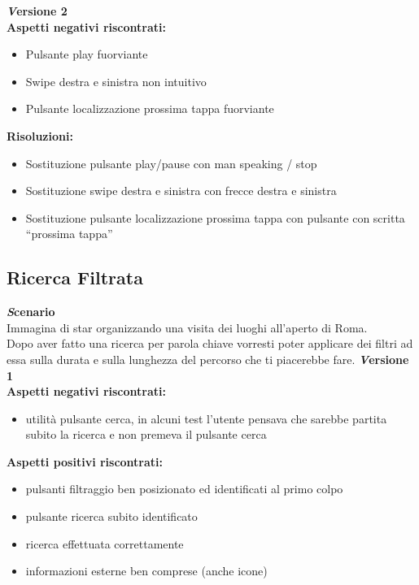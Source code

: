\textbf{\emph Versione 2}\\
\textbf{Aspetti negativi riscontrati:}
\begin{itemize}[label=-]

\item Pulsante play fuorviante
\item Swipe destra e sinistra non intuitivo
\item Pulsante localizzazione prossima tappa fuorviante

\end{itemize}

\textbf{Risoluzioni:}
\begin{itemize}[label=-]

\item Sostituzione pulsante play/pause con man speaking / stop
\item Sostituzione swipe destra e sinistra con frecce destra e sinistra
\item Sostituzione pulsante localizzazione prossima tappa con pulsante con scritta “prossima tappa”

\end{itemize}


\subsection{Ricerca Filtrata}
\textbf{\emph Scenario}\\
Immagina di star organizzando una visita dei luoghi all’aperto di Roma.\\
Dopo aver fatto una ricerca per parola chiave vorresti poter applicare dei filtri ad essa sulla durata e sulla lunghezza del percorso che ti piacerebbe fare.
\newline
\textbf{\emph Versione 1}\\
\textbf{Aspetti negativi riscontrati:}
\begin{itemize}[label=-]

\item utilità pulsante cerca, in alcuni test l’utente pensava che sarebbe partita subito la ricerca e non premeva il pulsante cerca

\end{itemize}

\textbf{Aspetti positivi riscontrati:}
\begin{itemize}[label=-]

\item pulsanti filtraggio ben posizionato ed identificati al primo colpo
\item pulsante ricerca subito identificato
\item ricerca effettuata correttamente
\item informazioni esterne ben comprese (anche icone)

\end{itemize}

